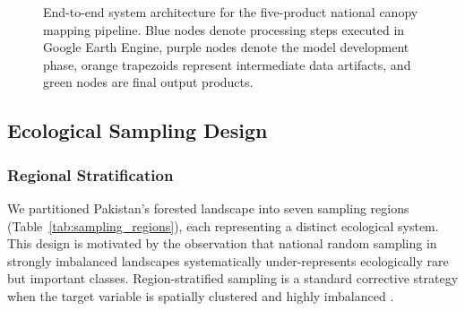 \documentclass[12pt,a4paper,twoside]{article}
\begin{document}
\begin{figure}[H]
{%
}%
\caption{End-to-end system architecture for the five-product national canopy
mapping pipeline.  Blue nodes denote processing steps executed in Google Earth
Engine, purple nodes denote the model development phase, orange trapezoids
represent intermediate data artifacts, and green nodes are final output
products.}
\label{fig:pipeline}
\end{figure}

\subsection{Ecological Sampling Design}\label{sec:sampling}

\subsubsection{Regional Stratification}

We partitioned Pakistan's forested landscape into seven sampling regions
(Table~\ref{tab:sampling_regions}), each representing a distinct ecological system.
This design is motivated by the observation that national random sampling in
strongly imbalanced landscapes systematically under-represents ecologically rare but
important classes.  Region-stratified sampling is a standard corrective strategy
when the target variable is spatially clustered and highly imbalanced
\citep{Roberts2017}.
\end{document}
